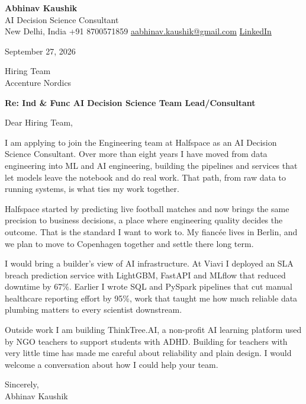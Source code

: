 \documentclass[11pt,a4paper]{article}
\begin{document}
{\Large\bfseries Abhinav Kaushik}\\
AI Decision Science Consultant\\
New Delhi, India \textbar{} +91 8700571859 \textbar{} \href{mailto:aabhinav.kaushik@gmail.com}{aabhinav.kaushik@gmail.com} \textbar{} \href{https://www.linkedin.com/in/abhinav-kaushik10/}{LinkedIn}  

September 27, 2026

Hiring Team\\
Accenture Nordics

\textbf{Re: Ind \& Func AI Decision Science Team Lead/Consultant}

Dear Hiring Team,

I am applying to join the Engineering team at Halfspace as an AI Decision Science Consultant. Over more than eight years I have moved from data engineering into ML and AI engineering, building the pipelines and services that let models leave the notebook and do real work. That path, from raw data to running systems, is what ties my work together.

Halfspace started by predicting live football matches and now brings the same precision to business decisions, a place where engineering quality decides the outcome. That is the standard I want to work to. My fiancée lives in Berlin, and we plan to move to Copenhagen together and settle there long term.

I would bring a builder's view of AI infrastructure. At Viavi I deployed an SLA breach prediction service with LightGBM, FastAPI and MLflow that reduced downtime by 67\%. Earlier I wrote SQL and PySpark pipelines that cut manual healthcare reporting effort by 95\%, work that taught me how much reliable data plumbing matters to every scientist downstream.

Outside work I am building ThinkTree.AI, a non-profit AI learning platform used by NGO teachers to support students with ADHD. Building for teachers with very little time has made me careful about reliability and plain design. I would welcome a conversation about how I could help your team.

Sincerely,\\[4pt]
Abhinav Kaushik
\end{document}
